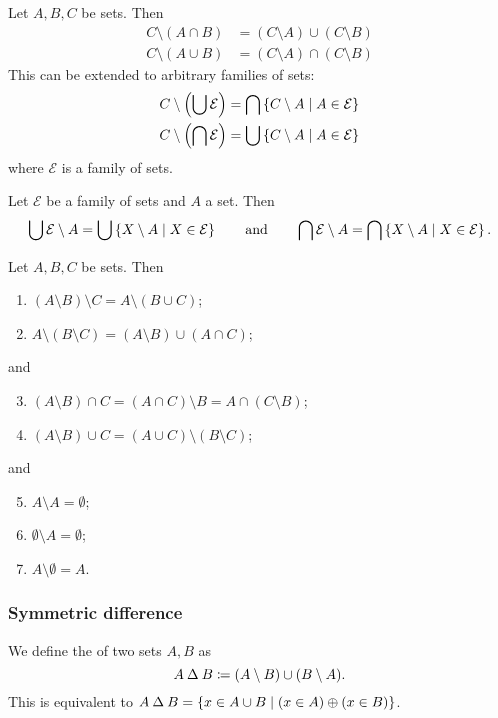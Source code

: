 \begin{proposition}
Let $A,B,C$ be sets. Then
\begin{align*}
C\setminus (A\cap B) &= (C\setminus A)\cup(C\setminus B) \\
C\setminus (A\cup B) &= (C\setminus A)\cap(C\setminus B)
\end{align*}
This can be extended to arbitrary families of sets:
\begin{align*}
C\setminus\left(\bigcup \mathcal{E}\right) &= \bigcap\left\{ C\setminus A \;\middle|\; A\in\mathcal{E} \right\} \\
C\setminus\left(\bigcap \mathcal{E}\right) &= \bigcup\left\{ C\setminus A \;\middle|\; A\in\mathcal{E} \right\}
\end{align*}
where $\mathcal{E}$ is a family of sets.
\end{proposition}
\begin{lemma}
Let $\mathcal{E}$ be a family of sets and $A$ a set. Then
\[ \bigcup \mathcal{E} \setminus A = \bigcup\left\{ X\setminus A \;\middle|\; X\in\mathcal{E} \right\} \qquad\text{and}\qquad \bigcap \mathcal{E} \setminus A = \bigcap\left\{ X\setminus A \;\middle|\; X\in\mathcal{E} \right\}. \]
\end{lemma}

\begin{lemma} \label{differenceProperties}
Let $A,B,C$ be sets. Then
\begin{enumerate}
\item $(A\setminus B)\setminus C = A\setminus (B\cup C)$;
\item $A\setminus (B\setminus C) = (A\setminus B) \cup (A\cap C)$;
\end{enumerate}
and
\begin{enumerate} \setcounter{enumi}{2}
\item $(A\setminus B)\cap C = (A\cap C)\setminus B = A\cap (C\setminus B)$;
\item $(A\setminus B)\cup C = (A\cup C)\setminus (B\setminus C)$;
\end{enumerate}
and
\begin{enumerate} \setcounter{enumi}{4}
\item $A\setminus A = \emptyset$;
\item $\emptyset\setminus A = \emptyset$;
\item $A\setminus \emptyset = A$.
\end{enumerate}
\end{lemma}

\subsubsection{Symmetric difference}
\begin{definition}
We define the  of two sets $A,B$ as
\[ A \mathbin{\Delta} B \coloneqq (A\setminus B)\cup(B\setminus A). \]
This is equivalent to $A\mathbin{\Delta} B = \left\{ x\in A\cup B \;\middle|\; (x\in A)\oplus (x\in B) \right\}$.
\end{definition}

